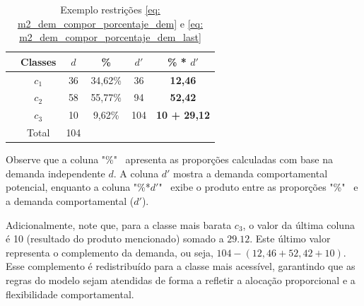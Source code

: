 \begin{table}[h!]
    \centering
    \caption{Exemplo restrições \ref{eq: m2_dem_compor_porcentaje_dem} e \ref{eq: m2_dem_compor_porcentaje_dem_last}}
    \begin{tabular}{lccccc}
        \toprule
        & Classes & $d$ & \% & $d'$ & \textbf{\% * $d'$} \\
        \midrule
              & $c_1$ & 36 & 34,62\% & 36 & \textbf{12,46} \\
              & $c_2$ & 58 & 55,77\% & 94 & \textbf{52,42} \\
              & $c_3$ & 10 & 9,62\% & 104 & \textbf{10 + 29,12} \\
        \midrule
              & Total & 104 & & & \\
        \bottomrule
    \end{tabular}
    \label{tab: exemplo_ajuste_demanda}
\end{table}

Observe que a coluna "\%" \, apresenta as proporções calculadas com base na demanda independente $d$. A coluna $d'$ mostra a demanda comportamental potencial, enquanto a coluna "\%*$d'$" \, exibe o produto entre as proporções "\%" \, e a demanda comportamental ($d'$).

Adicionalmente, note que, para a classe mais barata $c_3$, o valor da última coluna é 10 (resultado do produto mencionado) somado a $29.12$. Este último valor representa o complemento da demanda, ou seja, $104-(12,46+52,42+10)$. Esse complemento é redistribuído para a classe mais acessível, garantindo que as regras do modelo sejam atendidas de forma a refletir a alocação proporcional e a flexibilidade comportamental.

